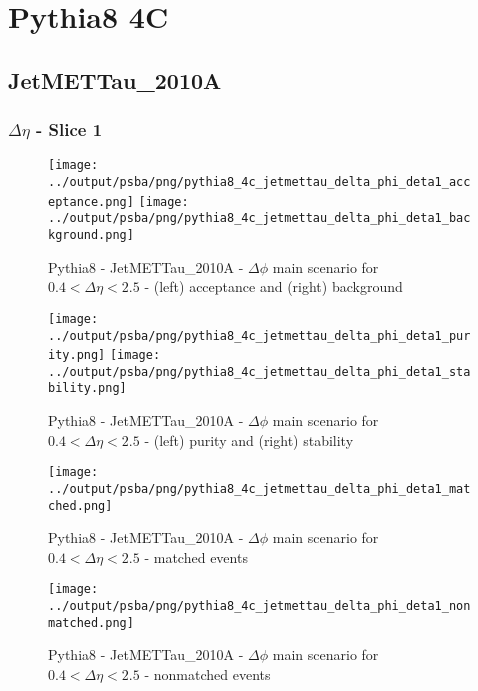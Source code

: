 \documentclass[11pt]{book}
\begin{document}
\clearpage
\section{Pythia8 4C}
\subsection{JetMETTau\_2010A}

\subsubsection{$\Delta\eta$ - Slice 1}

\begin{figure}[ht]
\centering
\texttt{[image: ../output/psba/png/pythia8\_4c\_jetmettau\_delta\_phi\_deta1\_acceptance.png]}
\texttt{[image: ../output/psba/png/pythia8\_4c\_jetmettau\_delta\_phi\_deta1\_background.png]}
\caption{Pythia8 - JetMETTau\_2010A - $\Delta\phi$ main scenario for $0.4 < \Delta\eta < 2.5$ - (left) acceptance and (right) background}
\label{fig:p8_jetmettau_delta_phi_deta1_ab}
\end{figure}

\begin{figure}[ht]
\centering
\texttt{[image: ../output/psba/png/pythia8\_4c\_jetmettau\_delta\_phi\_deta1\_purity.png]}
\texttt{[image: ../output/psba/png/pythia8\_4c\_jetmettau\_delta\_phi\_deta1\_stability.png]}
\caption{Pythia8 - JetMETTau\_2010A - $\Delta\phi$ main scenario for $0.4 < \Delta\eta < 2.5$ - (left) purity and (right) stability}
\label{fig:p8_jetmettau_delta_phi_deta1_ps}
\end{figure}

\begin{figure}[ht]
\centering
\texttt{[image: ../output/psba/png/pythia8\_4c\_jetmettau\_delta\_phi\_deta1\_matched.png]}
\caption{Pythia8 - JetMETTau\_2010A - $\Delta\phi$ main scenario for $0.4 < \Delta\eta < 2.5$ - matched events}
\label{fig:p8_jetmettau_delta_phi_deta1_matched}
\end{figure}

\begin{figure}[ht]
\centering
\texttt{[image: ../output/psba/png/pythia8\_4c\_jetmettau\_delta\_phi\_deta1\_nonmatched.png]}
\caption{Pythia8 - JetMETTau\_2010A - $\Delta\phi$ main scenario for $0.4 < \Delta\eta < 2.5$ - nonmatched events}
\label{fig:p8_jetmettau_delta_phi_deta1_nonmatched}
\end{figure}
\end{document}
